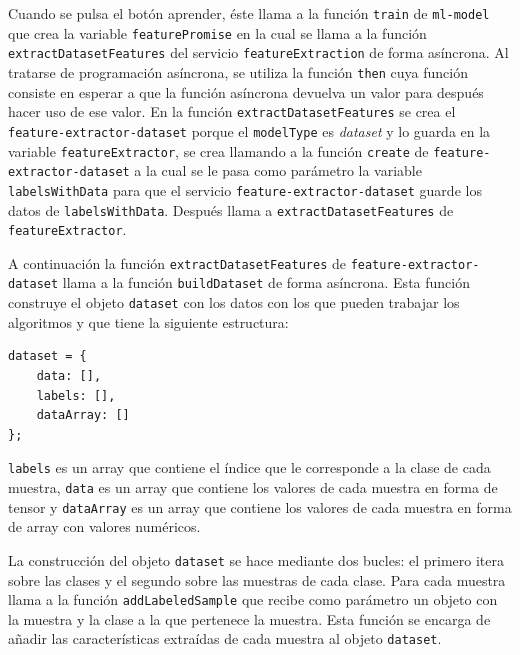 \documentclass[a4paper, 12pt]{book}
\begin{document}
Cuando se pulsa el botón aprender, éste llama a la función \texttt{train} de \texttt{ml-model} que crea la variable \texttt{featurePromise} en la cual se llama a la función \texttt{extractDatasetFeatures} del servicio \texttt{featureExtraction} de forma asíncrona. 
Al tratarse de programación asíncrona, se utiliza la función \texttt{then} cuya función consiste en esperar a que la función asíncrona devuelva un valor para después hacer uso de ese valor. 
En la función \texttt{extractDatasetFeatures} se crea el \texttt{feature-extractor-dataset} porque el \texttt{modelType} es \emph{dataset} y lo guarda en la variable \texttt{featureExtractor}, se crea llamando a la función \texttt{create} de \texttt{feature-
extractor-dataset} a la cual se le pasa como parámetro la variable \texttt{labelsWithData} para que el servicio \texttt{feature-extractor-dataset} guarde los datos de \texttt{labelsWithData}. 
Después llama a \texttt{extractDatasetFeatures} de \texttt{featureExtractor}.

A continuación la función \texttt{extractDatasetFeatures} de \texttt{feature-extractor-dataset} llama a la función \texttt{buildDataset} de forma asíncrona. Esta función construye el objeto \texttt{dataset} con los datos con los que pueden trabajar los algoritmos y que tiene la siguiente estructura:
\begin{verbatim}
dataset = {
    data: [],
    labels: [],
    dataArray: []
};
\end{verbatim}

\texttt{labels} es un array que contiene el índice que le corresponde a la clase de cada muestra, \texttt{data} es un array que contiene los valores de cada muestra en forma de tensor y \texttt{dataArray} es un array que contiene los valores de cada muestra en forma de array con valores numéricos.

La construcción del objeto \texttt{dataset} se hace mediante dos bucles: el primero itera sobre las clases y el segundo sobre las muestras de cada clase. 
Para cada muestra llama a la función \texttt{addLabeledSample} que recibe como parámetro un objeto con la muestra y la clase a la que pertenece la muestra. Esta función se encarga de añadir las características extraídas de cada muestra al objeto \texttt{dataset}. 
\end{document}
